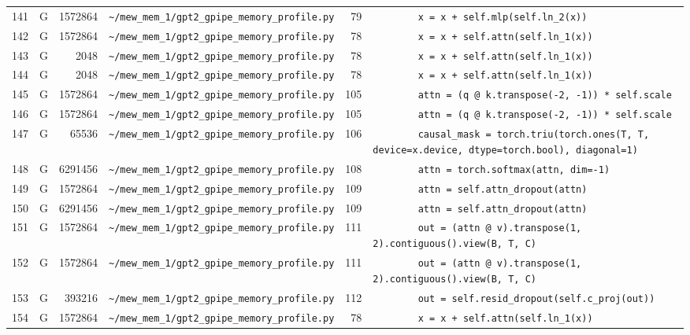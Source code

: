 \documentclass{article}
\begin{document}
\begin{longtable}{r l r p{6.5cm} r p{7.0cm}}
141 & G & 1572864 & \lstinline|~/mew_mem_1/gpt2_gpipe_memory_profile.py| & 79 & \lstinline|        x = x + self.mlp(self.ln_2(x))| \\
142 & G & 1572864 & \lstinline|~/mew_mem_1/gpt2_gpipe_memory_profile.py| & 78 & \lstinline|        x = x + self.attn(self.ln_1(x))| \\
143 & G & 2048 & \lstinline|~/mew_mem_1/gpt2_gpipe_memory_profile.py| & 78 & \lstinline|        x = x + self.attn(self.ln_1(x))| \\
144 & G & 2048 & \lstinline|~/mew_mem_1/gpt2_gpipe_memory_profile.py| & 78 & \lstinline|        x = x + self.attn(self.ln_1(x))| \\
145 & G & 1572864 & \lstinline|~/mew_mem_1/gpt2_gpipe_memory_profile.py| & 105 & \lstinline|        attn = (q @ k.transpose(-2, -1)) * self.scale| \\
146 & G & 1572864 & \lstinline|~/mew_mem_1/gpt2_gpipe_memory_profile.py| & 105 & \lstinline|        attn = (q @ k.transpose(-2, -1)) * self.scale| \\
147 & G & 65536 & \lstinline|~/mew_mem_1/gpt2_gpipe_memory_profile.py| & 106 & \lstinline|        causal_mask = torch.triu(torch.ones(T, T, device=x.device, dtype=torch.bool), diagonal=1)| \\
148 & G & 6291456 & \lstinline|~/mew_mem_1/gpt2_gpipe_memory_profile.py| & 108 & \lstinline|        attn = torch.softmax(attn, dim=-1)| \\
149 & G & 1572864 & \lstinline|~/mew_mem_1/gpt2_gpipe_memory_profile.py| & 109 & \lstinline|        attn = self.attn_dropout(attn)| \\
150 & G & 6291456 & \lstinline|~/mew_mem_1/gpt2_gpipe_memory_profile.py| & 109 & \lstinline|        attn = self.attn_dropout(attn)| \\
151 & G & 1572864 & \lstinline|~/mew_mem_1/gpt2_gpipe_memory_profile.py| & 111 & \lstinline|        out = (attn @ v).transpose(1, 2).contiguous().view(B, T, C)| \\
152 & G & 1572864 & \lstinline|~/mew_mem_1/gpt2_gpipe_memory_profile.py| & 111 & \lstinline|        out = (attn @ v).transpose(1, 2).contiguous().view(B, T, C)| \\
153 & G & 393216 & \lstinline|~/mew_mem_1/gpt2_gpipe_memory_profile.py| & 112 & \lstinline|        out = self.resid_dropout(self.c_proj(out))| \\
154 & G & 1572864 & \lstinline|~/mew_mem_1/gpt2_gpipe_memory_profile.py| & 78 & \lstinline|        x = x + self.attn(self.ln_1(x))| \\

\end{longtable}
\end{document}

